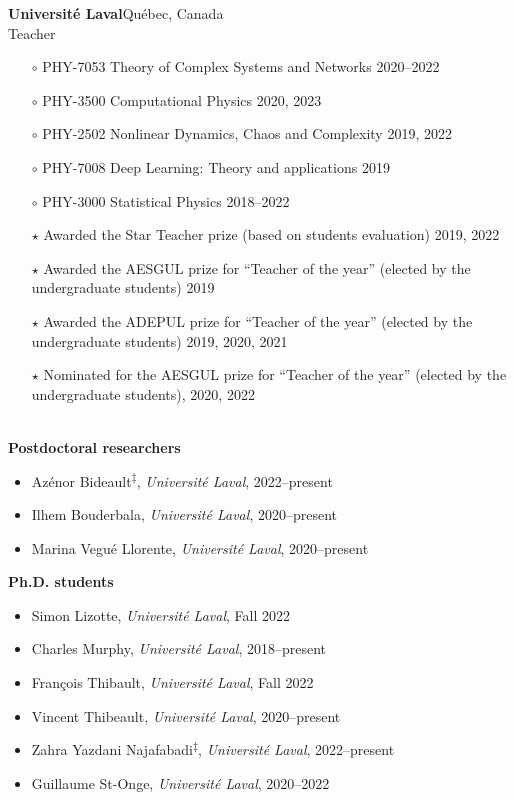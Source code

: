 \documentclass[11pt]{article}
\newcommand{\TitreSection}[1]{\colorbox{background}{\makebox[\textwidth-0.5em][c]{\Large\textrm{\textsc{#1}}}}\vspace{0.75\baselineskip}\\}
\begin{document}
%
\textbf{Universit\'e Laval}\hfill Qu\'ebec, Canada\\
Teacher
\begin{itemize}[leftmargin=1.5em]\small
  \item[$\circ$] PHY-7053 Theory of Complex Systems and Networks \hfill 2020--2022%
  \item[$\circ$] PHY-3500 Computational Physics \hfill 2020, 2023%
  \item[$\circ$] PHY-2502 Nonlinear Dynamics, Chaos and Complexity \hfill 2019, 2022%
  \item[$\circ$] PHY-7008 Deep Learning: Theory and applications \hfill 2019%
  \item[$\circ$] PHY-3000 Statistical Physics \hfill 2018--2022%
  \item[$\star$] Awarded the Star Teacher prize (based on students evaluation) 2019, 2022
  \item[$\star$] Awarded the AESGUL prize for ``Teacher of the year'' (elected by the undergraduate students) 2019
  \item[$\star$] Awarded the ADEPUL prize for ``Teacher of the year'' (elected by the undergraduate students) 2019, 2020, 2021
  \item[$\star$] Nominated for the AESGUL prize for ``Teacher of the year'' (elected by the undergraduate students), 2020, 2022
\end{itemize} \vspace{0.75\baselineskip}
%
%
%
%
%
\TitreSection{Mentoring\footnotemark}
%
%
\textbf{Postdoctoral researchers}
%
\begin{itemize}
  \item Azénor Bideault\textsuperscript{$\ddagger$}, \textit{Universit\'e Laval}, 2022--present
  \item Ilhem Bouderbala, \textit{Universit\'e Laval}, 2020--present
  \item Marina Vegué Llorente, \textit{Université Laval}, 2020--present
\end{itemize}
%
%
%
\textbf{Ph.D. students}
%
\begin{itemize}
  \item Simon Lizotte, \textit{Universit\'e Laval}, Fall 2022
  \item Charles Murphy, \textit{Universit\'e Laval}, 2018--present
  \item Fran\c{c}ois Thibault, \textit{Universit\'e Laval}, Fall 2022
  \item Vincent Thibeault, \textit{Université Laval}, 2020--present
  \item Zahra Yazdani Najafabadi\textsuperscript{$\ddagger$}, \textit{Université Laval}, 2022--present
  \item Guillaume St-Onge, \textit{Université Laval}, 2020--2022 \href{http://hdl.handle.net/20.500.11794/72971}{}
\end{itemize}
\end{document}
